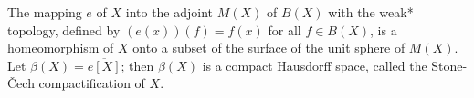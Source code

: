 The mapping $e$ of $X$ into the adjoint $M(X)$ of $B(X)$ with the weak* topology, defined by $(e(x))(f) = f(x)$ for all $f \in B(X)$, is a homeomorphism of $X$ onto a subset of the surface of the unit sphere of $M(X)$. Let $\beta(X) = \overline{e[X]}$; then $\beta(X)$ is a compact Hausdorff space, called the Stone-\v{C}ech compactification of $X$.

